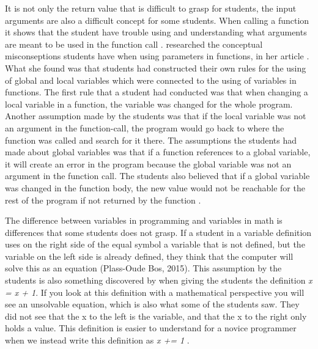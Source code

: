 It is not only the return value that is difficult to grasp for students, the input arguments are also a difficult concept for some students. 
When calling a function it shows that the student have trouble using and understanding what arguments are meant to be used in the function call \parencite{AltadmriBrown2015, Brown2014}. 
 researched the conceptual misconseptions students have when using parameters in functions, in her article . 
What she found was that students had constructed their own rules for the using of global and local variables which were connected to the using of variables in functions. 
The first rule that a student had conducted was that when changing a local variable in a function, the variable was changed for the whole program. 
Another assumption made by the students was that if the local variable was not an argument in the function-call, the program would go back to where the function was called and search for it there. 
The assumptions the students had made about global variables was that if a function references to a global variable, it will create an error in the program because the global variable was not an argument in the function call. 
The students also believed that if a global variable was changed in the function body, the new value would not be reachable for the rest of the program if not returned by the function \parencite{Fleury1991}.

The difference between variables in programming and variables in math is differences that some students does not grasp. 
If a student in a variable definition uses on the right side of the equal symbol a variable that is not defined, but the variable on the left side is already defined, they think that the computer will solve this as an equation (Plass-Oude Bos, 2015). 
This assumption by the students is also something discovered by \textcite{Kohn2017VariableEvaluation} when giving the students the definition \emph{x = x + 1}. 
If you look at this definition with a mathematical perspective you will see an unsolvable equation, which is also what some of the students saw. 
They did not see that the x to the left is the variable, and that the x to the right only holds a value. 
This definition is  easier to understand for a novice programmer when we instead write this definition as \emph{x += 1} \parencite{Kohn2017VariableEvaluation}. 


